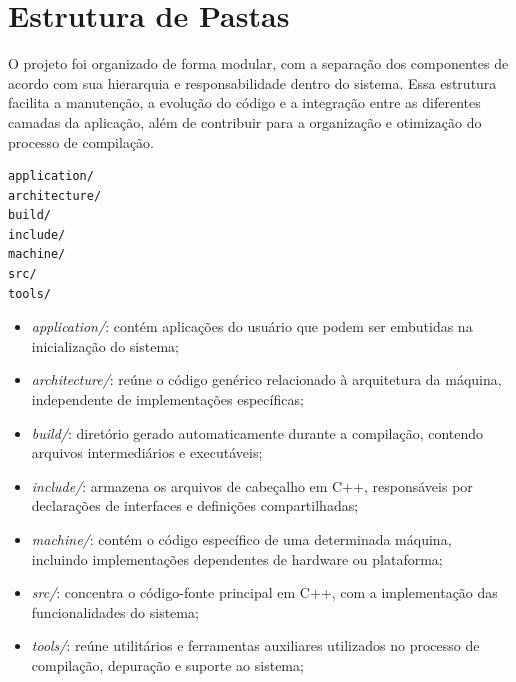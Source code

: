 \section{Estrutura de Pastas}

O projeto foi organizado de forma modular, com a separação dos componentes de acordo com sua hierarquia e responsabilidade dentro do sistema.
Essa estrutura facilita a manutenção, a evolução do código e a integração entre as diferentes camadas da aplicação, além de contribuir para a organização e otimização do processo de compilação.

\begin{verbatim}
application/
architecture/
build/
include/
machine/
src/
tools/
\end{verbatim}

\begin{itemize}
    \item \textit{application/}: contém aplicações do usuário que podem ser embutidas na inicialização do sistema;
    \item \textit{architecture/}: reúne o código genérico relacionado à arquitetura da máquina, independente de implementações específicas;
    \item \textit{build/}: diretório gerado automaticamente durante a compilação, contendo arquivos intermediários e executáveis;
    \item \textit{include/}: armazena os arquivos de cabeçalho em C++, responsáveis por declarações de interfaces e definições compartilhadas;
    \item \textit{machine/}: contém o código específico de uma determinada máquina, incluindo implementações dependentes de hardware ou plataforma;
    \item \textit{src/}: concentra o código-fonte principal em C++, com a implementação das funcionalidades do sistema;
    \item \textit{tools/}: reúne utilitários e ferramentas auxiliares utilizados no processo de compilação, depuração e suporte ao sistema;
\end{itemize}


